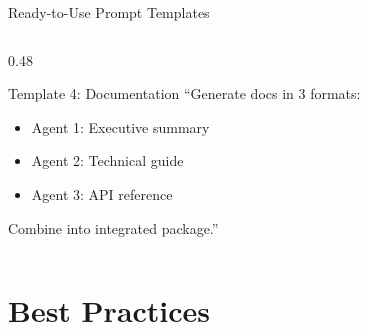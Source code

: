 \documentclass[aspectratio=169,11pt]{beamer}
\begin{document}
\begin{frame}{Ready-to-Use Prompt Templates}
\begin{columns}[T]
\begin{column}{0.48\textwidth}
            \begin{block}{Template 4: Documentation}
                \scriptsize
                ``Generate docs in 3 formats:
                \begin{itemize}
                    \item Agent 1: Executive summary
                    \item Agent 2: Technical guide
                    \item Agent 3: API reference
                \end{itemize}
                Combine into integrated package.''
            \end{block}
        \end{column}
    \end{columns}
\end{frame}

\section{Best Practices}
\end{document}
